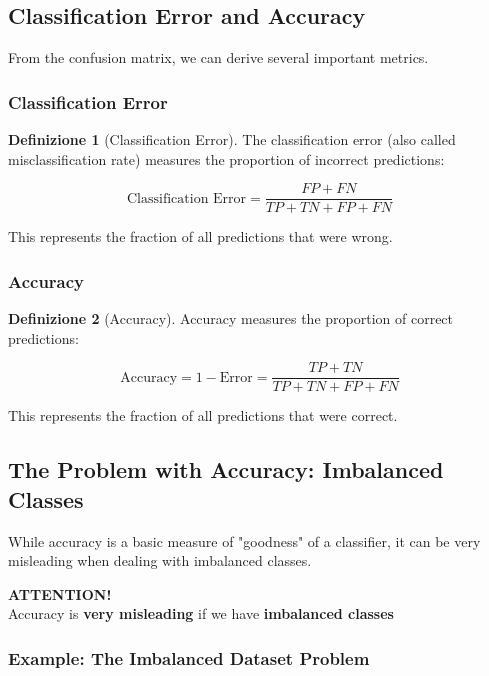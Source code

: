 \documentclass[11pt,a4paper]{article}
\theoremstyle{definition}
\newtheorem{definition}{Definizione}[section]
\theoremstyle{plain}
\theoremstyle{remark}
\begin{document}
\subsection{Classification Error and Accuracy}

From the confusion matrix, we can derive several important metrics.

\subsubsection{Classification Error}

\begin{definition}[Classification Error]
The classification error (also called misclassification rate) measures the proportion of incorrect predictions:

\[
\text{Classification Error} = \frac{FP + FN}{TP + TN + FP + FN}
\]

This represents the fraction of all predictions that were wrong.
\end{definition}

\subsubsection{Accuracy}

\begin{definition}[Accuracy]
Accuracy measures the proportion of correct predictions:

\[
\text{Accuracy} = 1 - \text{Error} = \frac{TP + TN}{TP + TN + FP + FN}
\]

This represents the fraction of all predictions that were correct.
\end{definition}

\subsection{The Problem with Accuracy: Imbalanced Classes}

While accuracy is a basic measure of "goodness" of a classifier, it can be very misleading when dealing with imbalanced classes.

\begin{center}
\colorbox{red!20}{\parbox{0.9\textwidth}{
\centering
\textbf{ATTENTION!}\\[0.2cm]
Accuracy is \textbf{very misleading} if we have \textbf{imbalanced classes}
}}
\end{center}

\subsubsection{Example: The Imbalanced Dataset Problem}
\end{document}
